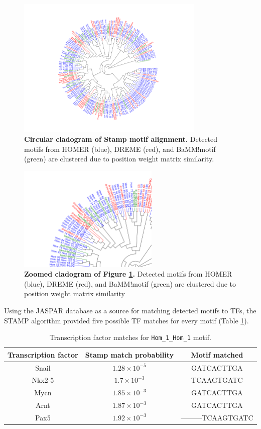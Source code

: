 \documentclass[12pt]{article}
\begin{document}
\begin{figure}[!htbp]
\centering
\includegraphics[width= 0.8\textwidth]{stampTree.pdf} 
\caption{{\bf Circular cladogram of Stamp motif alignment.} Detected motifs from HOMER (blue),  DREME (red), and BaMM!motif (green) are clustered due to position weight matrix similarity. }
\label{mainStampTree}
\end{figure}

\begin{figure}[!htbp]
\centering
\includegraphics[width= 0.6\textwidth]{stampTreeDetail.pdf} 
\caption{{\bf Zoomed cladogram of Figure \ref{mainStampTree}.} Detected motifs from HOMER (blue),  DREME (red), and BaMM!motif (green) are clustered due to position weight matrix similarity}
\label{treeDetail}
\end{figure}

Using the JASPAR database  \citep{Mathelier2016} as a source for matching detected motifs to TFs, the STAMP algorithm provided five possible TF matches for every motif (Table \ref{5tfs}). 

\begin{table}[!htbp]
\caption{Transcription factor matches for \texttt{Hom\_1\_Hom\_1} motif.}
\label{5tfs}
\centering
\begin{tabular}{ccc}
\toprule[0.2em]
Transcription factor & Stamp match probability & Motif matched \\
\midrule[0.1em]
Snail & $1.28\times10^{-5}$ & GATCACTTGA\\
Nkx2-5 & $1.7\times10^{-3}$ & TCAAGTGATC\\
Mycn & $1.85\times10^{-3}$ & GATCACTTGA\\
Arnt & $1.87\times10^{-3}$ & GATCACTTGA\\
Pax5 & $1.92\times10^{-3}$ & ---------TCAAGTGATC\\
\bottomrule[0.2em]
\end{tabular}
\end{table}
\end{document}
